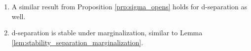 \begin{Rem}
    \begin{enumerate}
        \item A similar result from Proposition \ref{prp:sigma_opens} holds for d-separation as well.
        \item d-separation is stable under marginalization, similar to Lemma \ref{lem:stability_separation_marginalization}.
    \end{enumerate}
\end{Rem}

